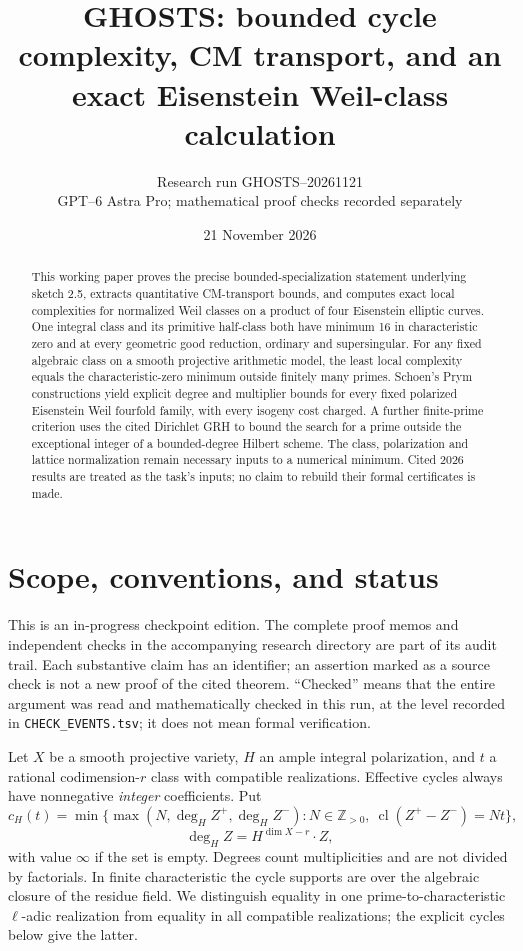 \documentclass[11pt]{article}
\title{GHOSTS: bounded cycle complexity, CM transport, and an exact Eisenstein Weil-class calculation}
\author{Research run GHOSTS--20261121\\GPT--6 Astra Pro; mathematical proof checks recorded separately}
\date{21 November 2026}
\theoremstyle{remark}
\newcommand{\Z}{\mathbb Z}
\newcommand{\cl}{\operatorname{cl}}
\begin{document}
\maketitle
\begin{abstract}
This working paper proves the precise bounded-specialization statement underlying sketch 2.5, extracts quantitative CM-transport bounds, and computes exact local complexities for normalized Weil classes on a product of four Eisenstein elliptic curves. One integral class and its primitive half-class both have minimum 16 in characteristic zero and at every geometric good reduction, ordinary and supersingular. For any fixed algebraic class on a smooth projective arithmetic model, the least local complexity equals the characteristic-zero minimum outside finitely many primes. Schoen's Prym constructions yield explicit degree and multiplier bounds for every fixed polarized Eisenstein Weil fourfold family, with every isogeny cost charged. A further finite-prime criterion uses the cited Dirichlet GRH to bound the search for a prime outside the exceptional integer of a bounded-degree Hilbert scheme. The class, polarization and lattice normalization remain necessary inputs to a numerical minimum. Cited 2026 results are treated as the task's inputs; no claim to rebuild their formal certificates is made.
\end{abstract}
\tableofcontents
\section{Scope, conventions, and status}
This is an in-progress checkpoint edition. The complete proof memos and independent checks in the accompanying research directory are part of its audit trail. Each substantive claim has an identifier; an assertion marked as a source check is not a new proof of the cited theorem. ``Checked'' means that the entire argument was read and mathematically checked in this run, at the level recorded in \texttt{CHECK\_EVENTS.tsv}; it does not mean formal verification.

Let $X$ be a smooth projective variety, $H$ an ample integral polarization, and $t$ a rational codimension-$r$ class with compatible realizations. Effective cycles always have nonnegative \emph{integer} coefficients. Put
\[
c_H(t)=\min\bigl\{\max(N,\deg_H Z^+,\deg_H Z^-):
N\in\Z_{>0},\ \cl(Z^+-Z^-)=Nt\bigr\},
\]
\[
\deg_H Z=H^{\dim X-r}\cdot Z,
\]
with value $\infty$ if the set is empty. Degrees count multiplicities and are not divided by factorials. In finite characteristic the cycle supports are over the algebraic closure of the residue field. We distinguish equality in one prime-to-characteristic $\ell$-adic realization from equality in all compatible realizations; the explicit cycles below give the latter.
\end{document}
